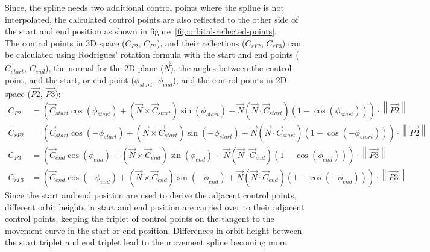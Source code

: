 Since, the spline needs two additional control points where the spline is not interpolated, the calculated control
points are also reflected to the other side of the start and end position as shown in
figure~\ref{fig:orbital-reflected-points}.
\\
The control points in 3D space ($C_{P2}$, $C_{P3}$), and their reflections ($C_{rP2}$, $C_{rP3}$) can be calculated
using Rodrigues' rotation formula with the start and end points ($C_{start}$, $C_{end}$), the normal for the 2D plane
($\vec{N}$), the angles between the control point, and the start, or end point ($\phi_{start}$, $\phi_{end}$), and the
control points in 2D space ($\overrightarrow{P2}$, $\overrightarrow{P3}$):
\begin{equation}
    \label{eq:control-point-transformation}
    \begin{aligned}
        C_{P2} &= \left(
            \vec{C}_{start} \cos(\phi_{start}) +
            ( \vec{N} \times \vec{C}_{start} )\sin(\phi_{start}) +
            \vec{N} ( \vec{N} \cdot \vec{C}_{start} )( 1 - \cos(\phi_{start}) )
        \right) \cdot \left\| \overrightarrow{P2} \right\|
        \\
        C_{rP2} &= \left(
            \vec{C}_{start} \cos(-\phi_{start}) +
            ( \vec{N} \times \vec{C}_{start} )\sin(-\phi_{start}) +
            \vec{N} ( \vec{N} \cdot \vec{C}_{start} )( 1 - \cos(-\phi_{start}) )
        \right) \cdot \left\| \overrightarrow{P2} \right\|
        \\
        C_{P3} &= \left(
            \vec{C}_{end} \cos(\phi_{end}) +
            ( \vec{N} \times \vec{C}_{end} )\sin(\phi_{end}) +
            \vec{N} ( \vec{N} \cdot \vec{C}_{end} )( 1 - \cos(\phi_{end}) )
        \right) \cdot \left\| \overrightarrow{P3} \right\|
        \\
        C_{rP3} &= \left(
            \vec{C}_{end} \cos(-\phi_{end}) +
            ( \vec{N} \times \vec{C}_{end} )\sin(-\phi_{end}) +
            \vec{N} ( \vec{N} \cdot \vec{C}_{end} )( 1 - \cos(-\phi_{end}) )
        \right) \cdot \left\| \overrightarrow{P3} \right\|
    \end{aligned}
\end{equation}
Since the start and end position are used to derive the adjacent control points, different orbit heights in start and
end position are carried over to their adjacent control points, keeping the triplet of control points on the tangent
to the movement curve in the start or end position.
Differences in orbit height between the start triplet and end triplet lead to the movement spline becoming more

